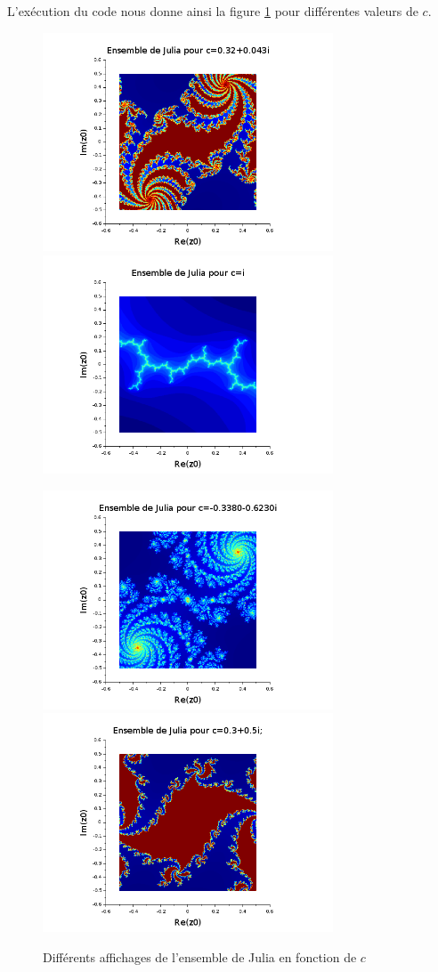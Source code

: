 \documentclass[a4paper,10pt]{report}
\begin{document}
L'exécution du code nous donne ainsi la figure \ref{affichage_julia} pour différentes valeurs de $c$.
\begin{figure}[H]
\caption{Différents affichages de l'ensemble de Julia en fonction de $c$}
   \begin{minipage}[c]{.49\linewidth}
   \centering
      \includegraphics[height=6.5cm]{julia1.png}
      \includegraphics[height=6.5cm]{julia2.png}
   \end{minipage} \hfill
   \begin{minipage}[c]{.49\linewidth}
   \centering
      \includegraphics[height=6.5cm]{julia3.png}
      \includegraphics[height=6.5cm]{julia4.png}
   \end{minipage}
\label{affichage_julia}
\end{figure}
\end{document}
